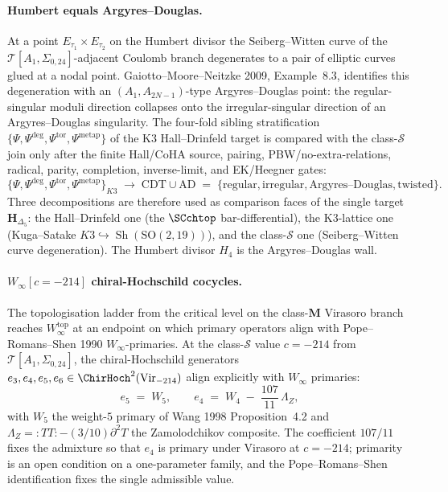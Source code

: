 \paragraph{Humbert equals Argyres--Douglas.}
At a point $E_{\tau_1}\times E_{\tau_2}$ on the Humbert divisor the
Seiberg--Witten curve of the $\mathcal{T}[A_1,\Sigma_{0,24}]$-adjacent
Coulomb branch degenerates to a pair of elliptic curves glued at a
nodal point. Gaiotto--Moore--Neitzke 2009, Example~8.3, identifies
this degeneration with an $(A_1, A_{2N-1})$-type Argyres--Douglas
point: the regular-singular moduli direction collapses onto the
irregular-singular direction of an Argyres--Douglas singularity. The
four-fold sibling stratification
$\{\Psi,\Psi^{\deg},\Psi^{\mathrm{tor}},\Psi^{\mathrm{metap}}\}$ of
the K3 Hall--Drinfeld target is compared with the class-$\mathcal{S}$
join only after the finite Hall/CoHA source, pairing,
PBW/no-extra-relations, radical, parity, completion, inverse-limit, and
EK/Heegner gates:
\[
\{\Psi,\Psi^{\deg},\Psi^{\mathrm{tor}},\Psi^{\mathrm{metap}}\}_{K3}
\;\longrightarrow\;
\mathrm{CDT}\cup\mathrm{AD}
\;=\;
\{\text{regular},\text{irregular},\text{Argyres--Douglas},\text{twisted}\}.
\]
Three decompositions are therefore used as comparison faces of the
single target $\mathbf{H}_{\Delta_5}$: the Hall--Drinfeld one (the $\SCchtop$
bar-differential), the K3-lattice one (Kuga--Satake
$K3\hookrightarrow\operatorname{Sh}(\mathrm{SO}(2,19))$), and the
class-$\mathcal{S}$ one (Seiberg--Witten curve degeneration). The
Humbert divisor $H_4$ is the Argyres--Douglas wall.

\paragraph{$W_\infty[c=-214]$ chiral-Hochschild cocycles.}
The topologisation ladder from the critical level on the class-$\mathbf{M}$
Virasoro branch reaches $W_\infty^{\mathrm{top}}$ at an endpoint on
which primary operators align with Pope--Romans--Shen 1990
$W_\infty$-primaries. At the class-$\mathcal{S}$ value $c = -214$ from
$\mathcal{T}[A_1,\Sigma_{0,24}]$, the chiral-Hochschild generators
$e_3, e_4, e_5, e_6 \in \ChirHoch^2(\mathrm{Vir}_{-214})$ align
explicitly with $W_\infty$ primaries:
\[
e_5
\;=\;
W_5,
\qquad
e_4
\;=\;
W_4 \;-\; \frac{107}{11}\,\Lambda_Z,
\]
with $W_5$ the weight-$5$ primary of Wang 1998 Proposition~4.2 and
$\Lambda_Z = {:}TT{:} - (3/10)\partial^2 T$ the Zamolodchikov composite.
The coefficient $107/11$ fixes the admixture so that $e_4$ is primary
under Virasoro at $c = -214$; primarity is an open condition on a
one-parameter family, and the Pope--Romans--Shen identification fixes
the single admissible value.

